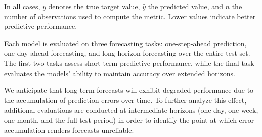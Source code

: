 \par
In all cases, $y$ denotes the true target value, $\hat{y}$ the predicted value, and $n$ the number of observations used to compute the metric. Lower values indicate better predictive performance.

\par
Each model is evaluated on three forecasting tasks: one-step-ahead prediction, one-day-ahead forecasting, and long-horizon forecasting over the entire test set. The first two tasks assess short-term predictive performance, while the final task evaluates the models' ability to maintain accuracy over extended horizons.

\par
We anticipate that long-term forecasts will exhibit degraded performance due to the accumulation of prediction errors over time. To further analyze this effect, additional evaluations are conducted at intermediate horizons (one day, one week, one month, and the full test period) in order to identify the point at which error accumulation renders forecasts unreliable.



